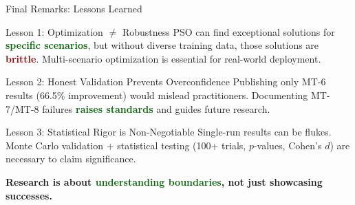 \documentclass[10pt,aspectratio=169]{beamer}
\newcommand{\emphred}[1]{\textcolor{darkred}{\textbf{#1}}}
\newcommand{\emphgreen}[1]{\textcolor{darkgreen}{\textbf{#1}}}
\begin{document}
\begin{frame}{Final Remarks: Lessons Learned}
\begin{block}{Lesson 1: Optimization $\neq$ Robustness}
PSO can find exceptional solutions for \emphgreen{specific scenarios}, but without diverse training data, those solutions are \emphred{brittle}. Multi-scenario optimization is essential for real-world deployment.
\end{block}

\begin{block}{Lesson 2: Honest Validation Prevents Overconfidence}
Publishing only MT-6 results (66.5\% improvement) would mislead practitioners. Documenting MT-7/MT-8 failures \emphgreen{raises standards} and guides future research.
\end{block}

\begin{block}{Lesson 3: Statistical Rigor is Non-Negotiable}
Single-run results can be flukes. Monte Carlo validation + statistical testing (100+ trials, $p$-values, Cohen's $d$) are necessary to claim significance.
\end{block}

\vspace{0.3cm}
\centering
\Large
\textbf{Research is about \emphgreen{understanding boundaries}, not just showcasing successes.}
\end{frame}
\end{document}
